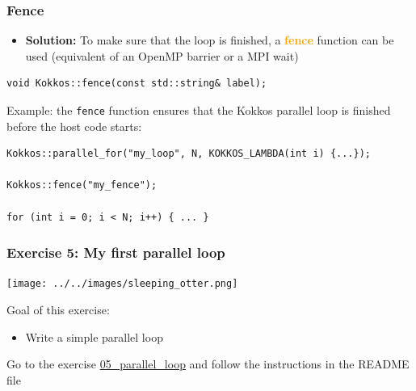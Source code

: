 \documentclass[aspectratio=169]{beamer}
\newcommand{\highlight}[1]{\textcolor{orange}{\textbf{#1}}}
\begin{document}

\begin{frame}[fragile]
    \frametitle{Fence} 

\begin{itemize}
    \item \textbf{Solution:} To make sure that the loop is finished, a \highlight{fence} function can be used (equivalent of an OpenMP barrier or a MPI wait)
\end{itemize}

\begin{verbatim}
void Kokkos::fence(const std::string& label);
\end{verbatim}

Example: the \texttt{fence} function ensures that the Kokkos parallel loop is finished before the host code starts:

\small
\begin{verbatim}
Kokkos::parallel_for("my_loop", N, KOKKOS_LAMBDA(int i) {...});

Kokkos::fence("my_fence");

for (int i = 0; i < N; i++) { ... }
\end{verbatim}

\end{frame}


\begin{frame}[fragile]
    \frametitle{Exercise 5: My first parallel loop} 

    \begin{center}
    \texttt{[image: ../../images/sleeping\_otter.png]}
    \end{center}

    Goal of this exercise:

    \begin{itemize}
        \item Write a simple parallel loop
    \end{itemize}

    \begin{block}{}
        Go to the exercise \href{https://github.com/CExA-project/cexa-kokkos-tutorials/tree/main/exercises/05_parallel_loop}{05\_parallel\_loop} and follow the instructions in the README file
    \end{block}

\end{frame}
\end{document}
